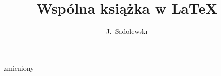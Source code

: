 \documentclass[12pt,a4paper]{book}
\author{J.~Sadolewski}
\title{Wspólna książka w \LaTeX{}}
\begin{document}
\maketitle


zmieniony
\end{document}
